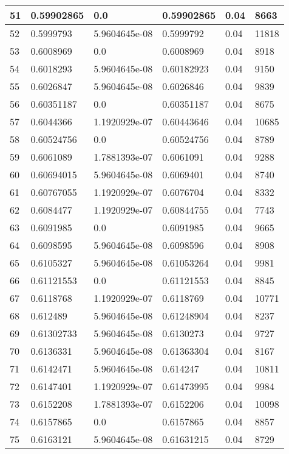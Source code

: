 \begin{longtable}{|l|l|l|l|l|l|}
51 & 0.59902865 & 0.0 & 0.59902865 & 0.04 & 8663 \\ \hline 
52 & 0.5999793 & 5.9604645e-08 & 0.5999792 & 0.04 & 11818 \\ \hline 
53 & 0.6008969 & 0.0 & 0.6008969 & 0.04 & 8918 \\ \hline 
54 & 0.6018293 & 5.9604645e-08 & 0.60182923 & 0.04 & 9150 \\ \hline 
55 & 0.6026847 & 5.9604645e-08 & 0.6026846 & 0.04 & 9839 \\ \hline 
56 & 0.60351187 & 0.0 & 0.60351187 & 0.04 & 8675 \\ \hline 
57 & 0.6044366 & 1.1920929e-07 & 0.60443646 & 0.04 & 10685 \\ \hline 
58 & 0.60524756 & 0.0 & 0.60524756 & 0.04 & 8789 \\ \hline 
59 & 0.6061089 & 1.7881393e-07 & 0.6061091 & 0.04 & 9288 \\ \hline 
60 & 0.60694015 & 5.9604645e-08 & 0.6069401 & 0.04 & 8740 \\ \hline 
61 & 0.60767055 & 1.1920929e-07 & 0.6076704 & 0.04 & 8332 \\ \hline 
62 & 0.6084477 & 1.1920929e-07 & 0.60844755 & 0.04 & 7743 \\ \hline 
63 & 0.6091985 & 0.0 & 0.6091985 & 0.04 & 9665 \\ \hline 
64 & 0.6098595 & 5.9604645e-08 & 0.6098596 & 0.04 & 8908 \\ \hline 
65 & 0.6105327 & 5.9604645e-08 & 0.61053264 & 0.04 & 9981 \\ \hline 
66 & 0.61121553 & 0.0 & 0.61121553 & 0.04 & 8845 \\ \hline 
67 & 0.6118768 & 1.1920929e-07 & 0.6118769 & 0.04 & 10771 \\ \hline 
68 & 0.612489 & 5.9604645e-08 & 0.61248904 & 0.04 & 8237 \\ \hline 
69 & 0.61302733 & 5.9604645e-08 & 0.6130273 & 0.04 & 9727 \\ \hline 
70 & 0.6136331 & 5.9604645e-08 & 0.61363304 & 0.04 & 8167 \\ \hline 
71 & 0.6142471 & 5.9604645e-08 & 0.614247 & 0.04 & 10811 \\ \hline 
72 & 0.6147401 & 1.1920929e-07 & 0.61473995 & 0.04 & 9984 \\ \hline 
73 & 0.6152208 & 1.7881393e-07 & 0.6152206 & 0.04 & 10098 \\ \hline 
74 & 0.6157865 & 0.0 & 0.6157865 & 0.04 & 8857 \\ \hline 
75 & 0.6163121 & 5.9604645e-08 & 0.61631215 & 0.04 & 8729 \\ \hline 
\end{longtable}
